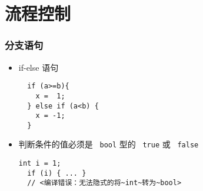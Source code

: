 \section{流程控制}

\begin{frame}[fragile]
\frametitle{分支语句}
  \begin{itemize}
  \item if-else 语句
\begin{lstlisting}
  if (a>=b){
    x =  1;
  } else if (a<b) {
    x = -1;
  }
\end{lstlisting}
    \pause
  \item 判断条件的值必须是~ \texttt{bool} 型的~ \texttt{true} 或~ \texttt{false}
\begin{lstlisting}[escapeinside=<>]
  int i = 1;
  if (i) { ... }
  // <编译错误：无法隐式的将~int~转为~bool>
\end{lstlisting}
  \end{itemize}
\end{frame}

